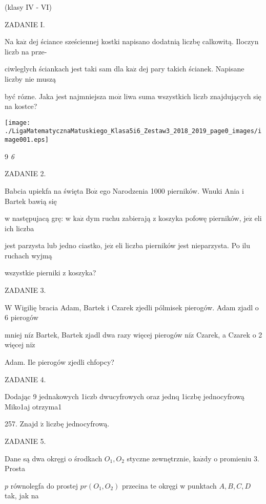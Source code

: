 \documentclass[a4paper,12pt]{article}
\begin{document}
(klasy IV - VI)

ZADANIE I.

Na $\mathrm{k}\mathrm{a}\dot{\mathrm{z}}$ dej ściance sześciennej kostki napisano dodatnią liczbę calkowitą. Iloczyn liczb na prze-

ciwleglych ściankach jest taki sam dla $\mathrm{k}\mathrm{a}\dot{\mathrm{z}}$ dej pary takich ścianek. Napisane liczby nie muszą

być rózne. Jaka jest najmniejsza $\mathrm{m}\mathrm{o}\dot{\mathrm{z}}$ liwa suma wszystkich liczb znajdujących się na kostce?
\begin{center}
\texttt{[image: ./LigaMatematycznaMatuskiego\_Klasa5i6\_Zestaw3\_2018\_2019\_page0\_images/image001.eps]}
\end{center}
9 {\it 6}

ZADANIE 2.

Babcia upiekfa na święta $\mathrm{B}\mathrm{o}\dot{\mathrm{z}}$ ego Narodzenia 1000 pierników. Wnuki Ania i Bartek bawią się

w następujacą grę: w $\mathrm{k}\mathrm{a}\dot{\mathrm{z}}$ dym ruchu zabierają z koszyka pofowę pierników, $\mathrm{j}\mathrm{e}\dot{\mathrm{z}}$ eli ich liczba

jest parzysta lub jedno ciastko, $\mathrm{j}\mathrm{e}\dot{\mathrm{z}}$ eli liczba pierników jest nieparzysta. Po ilu ruchach wyjmą

wszystkie pierniki z koszyka?

ZADANIE 3.

W Wigilię bracia Adam, Bartek i Czarek zjedli pólmisek pierogów. Adam zjadl o 6 pierogów

mniej $\mathrm{n}\mathrm{i}\dot{\mathrm{z}}$ Bartek, Bartek zjadl dwa razy więcej pierogów $\mathrm{n}\mathrm{i}\dot{\mathrm{z}}$ Czarek, a Czarek o 2 więcej $\mathrm{n}\mathrm{i}\dot{\mathrm{z}}$

Adam. Ile pierogów zjedli chfopcy?

ZADANIE 4.

Dodając 9 jednakowych 1iczb dwucyfrowych oraz jednq 1iczbę jednocyfrową Miko1aj otrzyma1

257. Znajd $\acute{\mathrm{z}}$ liczbę jednocyfrową.

ZADANIE 5.

Dane są dwa okręgi o środkach $O_{1}, O_{2}$ styczne zewnętrznie, $\mathrm{k}\mathrm{a}\dot{\mathrm{z}}\mathrm{d}\mathrm{y}$ o promieniu 3. Prosta

$p$ równolegfa do prostej $pr(O_{1},O_{2})$ przecina te okręgi w punktach $A, B, C, D$ tak, jak na
\end{document}
